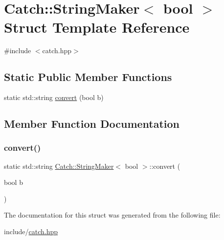 \hypertarget{structCatch_1_1StringMaker_3_01bool_01_4}{}\section{Catch\+:\+:String\+Maker$<$ bool $>$ Struct Template Reference}
\label{structCatch_1_1StringMaker_3_01bool_01_4}


{\ttfamily \#include $<$catch.\+hpp$>$}

\subsection*{Static Public Member Functions}
\begin{DoxyCompactItemize}
\item 
static std\+::string \mbox{\hyperlink{structCatch_1_1StringMaker_3_01bool_01_4_a37e9899c82c4b4515f876f16f8957a77}{convert}} (bool b)
\end{DoxyCompactItemize}


\subsection{Member Function Documentation}
\mbox{\label{structCatch_1_1StringMaker_3_01bool_01_4_a37e9899c82c4b4515f876f16f8957a77}} 
\subsubsection{\texorpdfstring{convert()}{convert()}}
{\footnotesize\ttfamily static std\+::string \mbox{\hyperlink{structCatch_1_1StringMaker}{Catch\+::\+String\+Maker}}$<$ bool $>$\+::convert (\begin{DoxyParamCaption}\item[{bool}]{b }\end{DoxyParamCaption})\hspace{0.3cm}{\ttfamily [static]}}



The documentation for this struct was generated from the following file\+:\begin{DoxyCompactItemize}
\item 
include/\mbox{\hyperlink{catch_8hpp}{catch.\+hpp}}\end{DoxyCompactItemize}

